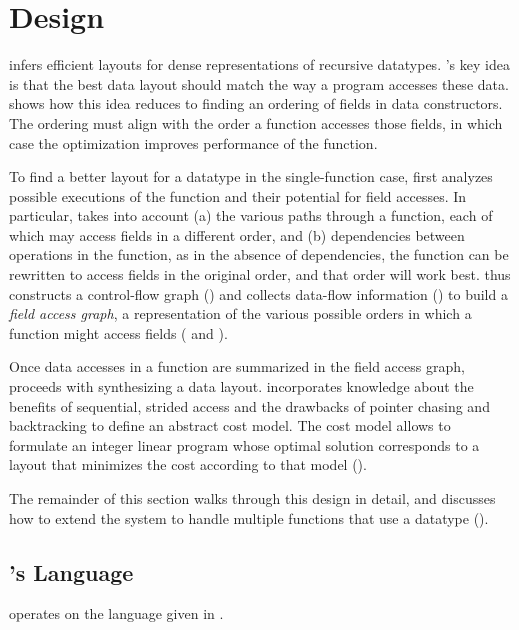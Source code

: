 \section{Design}
\label{sec:design}

\system infers efficient layouts for dense representations of recursive
datatypes. \system's key idea is that the best data layout should match the way
a program accesses these data.
%
 shows how this idea reduces to finding an
ordering of fields in data constructors. The ordering must align with the
order a function accesses those fields, in which case the optimization improves
performance of the function.

To find a better layout for a datatype in the single-function case, \system first analyzes possible executions of the function and their potential for field accesses. In particular, \system takes into account (a) the various paths through a function, each of which may access fields in a different order, and (b) dependencies between operations in the function, as in the absence of dependencies, the function can be rewritten to access fields in the original order, and that order will work best. \system thus constructs a control-flow graph () and collects data-flow information () to build a {\em field access graph}, a representation of the various possible orders in which a function might access fields ( and ).

Once data accesses in a function are summarized in the field access graph, \system proceeds with synthesizing a data layout. \system incorporates knowledge about the benefits of sequential, strided access and the drawbacks of pointer chasing and backtracking to define an abstract cost model. The cost model allows to formulate an integer linear program whose optimal solution corresponds to a layout that minimizes the cost according to that model ().

The remainder of this section walks through this design in detail, and discusses how to extend the system to handle multiple functions that use a datatype ().

\subsection{\system's Language}
\system{} operates on the language \systemlang{} given in .



